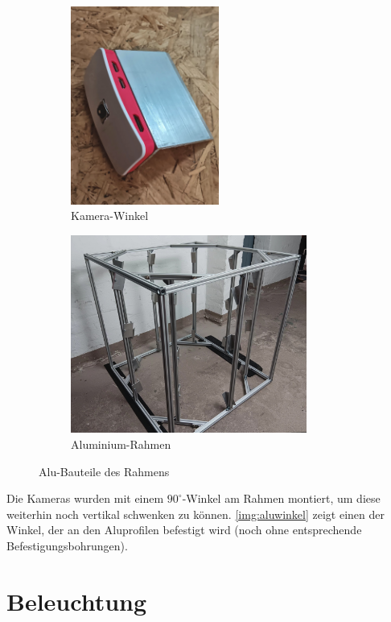 \documentclass[./00PhotoBox.tex]{subfiles}
\begin{document}
\begin{figure}[htbp]
    \centering
    \begin{subfigure}{0.38\textwidth}
        \includegraphics[height=6.5cm]{./img/3_aufbau/aluwinkel.jpg}
        \centering
        \caption{Kamera-Winkel}
        \label{img:aluwinkel}
    \end{subfigure}
    \begin{subfigure}{0.58\textwidth}
        \includegraphics[height=6.5cm]{./img/3_aufbau/alurahmen.jpg}
        \centering
        \caption{Aluminium-Rahmen}
        \label{img:alurahmen} %
    \end{subfigure}
    \caption{Alu-Bauteile des Rahmens}
\end{figure}

Die Kameras wurden mit einem $90^\circ$-Winkel am Rahmen montiert, um diese weiterhin noch vertikal schwenken zu können. \autoref{img:aluwinkel} zeigt einen der Winkel, der an den Aluprofilen befestigt wird (noch ohne entsprechende Befestigungsbohrungen).


\section{Beleuchtung}
\end{document}
